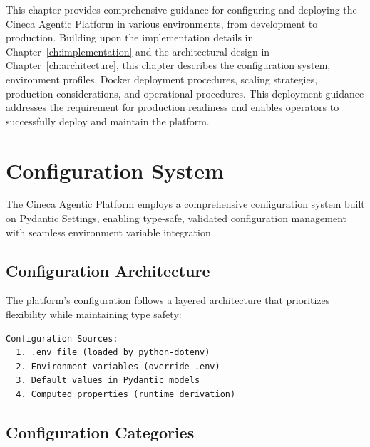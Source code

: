 \documentclass[a4paper,twoside]{sapthesis}
\begin{document}
This chapter provides comprehensive guidance for configuring and deploying the Cineca Agentic Platform in various environments, from development to production. Building upon the implementation details in Chapter~\ref{ch:implementation} and the architectural design in Chapter~\ref{ch:architecture}, this chapter describes the configuration system, environment profiles, Docker deployment procedures, scaling strategies, production considerations, and operational procedures. This deployment guidance addresses the requirement for production readiness and enables operators to successfully deploy and maintain the platform.

\section{Configuration System}
\label{sec:configuration}

The Cineca Agentic Platform employs a comprehensive configuration system built on Pydantic Settings, enabling type-safe, validated configuration management with seamless environment variable integration.

\subsection{Configuration Architecture}

The platform's configuration follows a layered architecture that prioritizes flexibility while maintaining type safety:

\begin{verbatim}
Configuration Sources:
  1. .env file (loaded by python-dotenv)
  2. Environment variables (override .env)
  3. Default values in Pydantic models
  4. Computed properties (runtime derivation)
\end{verbatim}

\subsection{Configuration Categories}
\end{document}
